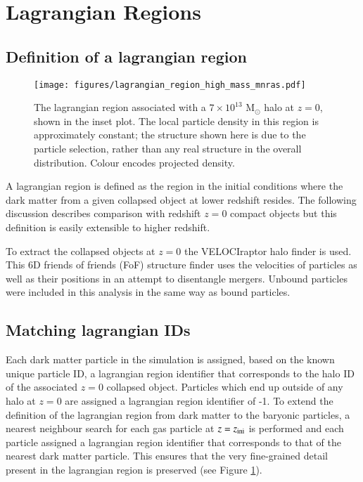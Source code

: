 \section{Lagrangian Regions}
\label{sec:lagrangianregions}

\subsection{Definition of a lagrangian region}

\begin{figure}
    \centering
    \texttt{[image: figures/lagrangian\_region\_high\_mass\_mnras.pdf]}
    \caption{The lagrangian region associated with a $7\times10^{13}$
	$\mathrm{M}_\odot$ halo at $z=0$, shown in the inset plot. The local
	particle density in this region is approximately constant; the
	structure shown here is due to the particle selection, rather than any
	real structure in the overall distribution. Colour encodes projected
	density.}
    \label{fig:lrpic}
\end{figure}

A lagrangian region is defined as the region in the initial conditions where
the dark matter from a given collapsed object at lower redshift resides. The
following discussion describes comparison with redshift $z=0$ compact objects
but this definition is easily extensible to higher redshift.

To extract the collapsed objects at $z=0$ the VELOCIraptor halo finder is
used. This 6D friends of friends (FoF) structure finder uses the velocities of
particles as well as their positions in an attempt to disentangle mergers.
Unbound particles were included in this analysis in the same way as bound
particles.

\subsection{Matching lagrangian IDs}

Each dark matter particle in the simulation is assigned, based on the known
unique particle ID, a lagrangian region identifier that corresponds to the halo
ID of the associated $z=0$ collapsed object. Particles which end up outside of
any halo at $z=0$ are assigned a lagrangian region identifier of -1. 
To extend the definition of the lagrangian region from dark matter to the
baryonic particles, a nearest neighbour search for each gas
particle at $z=z_{\rm ini}$ is performed and each particle assigned a
lagrangian region identifier that corresponds to that of the nearest dark
matter particle. This ensures that the very fine-grained detail present in the
lagrangian region is preserved (see Figure \ref{fig:lrpic}).

